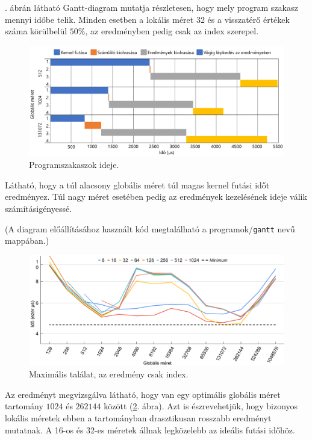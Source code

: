 . ábrán látható Gantt-diagram mutatja részletesen, hogy mely program szakasz mennyi időbe telik.
Minden esetben a lokális méret 32 és a visszatérő értékek száma körülbelül $50\%$, az eredményben pedig csak az index szerepel.

\begin{figure}[h!]
\centering
\includegraphics[width=\textwidth]{images/gantt.png}
\caption{Programszakaszok ideje.}
\label{fig:gantt}
\end{figure}

Látható, hogy a túl alacsony globális méret túl magas kernel futási időt eredményez. Túl nagy méret esetében pedig az eredmények kezelésének ideje válik számításigényessé.

(A diagram előállításához használt kód megtalálható a programok/\texttt{gantt} nevű mappában.)

\begin{figure}[h!]
\centering
\includegraphics[width=\textwidth]{images/graph/global_size_1.png}
\caption{Maximális találat, az eredmény csak index.}
\label{fig:global_size_1}
\end{figure}

Az eredményt megvizsgálva látható, hogy van egy optimális globális méret tartomány $1024$ és $262144$ között (\ref{fig:global_size_1}. ábra).
Azt is észrevehetjük, hogy bizonyos lokális méretek ebben a tartományban drasztikusan rosszabb eredményt mutatnak.
A 16-os és 32-es méretek állnak legközelebb az ideális futási időhöz.

